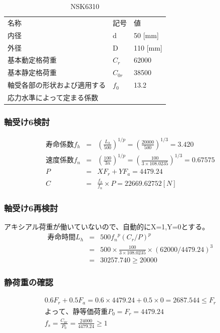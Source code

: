 \documentclass[a4j,twoside,openright,11pt]{jreport}
\begin{document}
\begin{table}[htb]
\begin{center}
  \caption{NSK6310}
  \begin{tabular}{lll} \hline
名称&記号&値\\
内径& d &50 [mm]\\
外径& D &110 [mm]\\
基本動定格荷重&$C_{r}$&62000\\
基本静定格荷重&$C_{0r}$&38500\\
軸受各部の形状および適用する&$f_0$&13.2\\
応力水準によって定まる係数&&\\
\hline
  \end{tabular}
\end{center}
\end{table}


\subsubsection{軸受け6検討}
\begin{eqnarray}
寿命係数f_h &=& \left( \frac{L_h}{500} \right)^{1/p} = \left( \frac{20000}{500} \right)^{1/3} = 3.420\\
速度係数f_n &=& \left( \frac{100}{3n} \right)^{1/p} = \left( \frac{100}{3 \times 108.0235} \right)^{1/3} = 0.67575\\
P &=& XF_r+YF_a = 4479.24\\
C &=& \frac{f_h}{f_n} \times P = 22669.62752[N]
\end{eqnarray}

\subsubsection{軸受け6再検討}
アキシアル荷重が働いていないので、自動的にX=1,Y=0とする。
\begin{eqnarray}
寿命時間L_h &=& 500{f_n}^p(C_r/P)^p\\
           &=& 500 \times \frac{100}{3 \times 108.0235} \times (62000/4479.24)^3\\
           &=& 30257.740 \geq 20000
\end{eqnarray}

\subsubsection{静荷重の確認}
\begin{eqnarray}
0.6F_r+0.5F_a=0.6 \times 4479.24 + 0.5 \times 0 = 2687.544 \leq F_r\\
よって、静等価荷重P_0 = F_r = 4479.24\\
f_s = \frac{C_{0r}}{P_0} = \frac{24000}{4479.24} \geq 1
\end{eqnarray}
\end{document}
